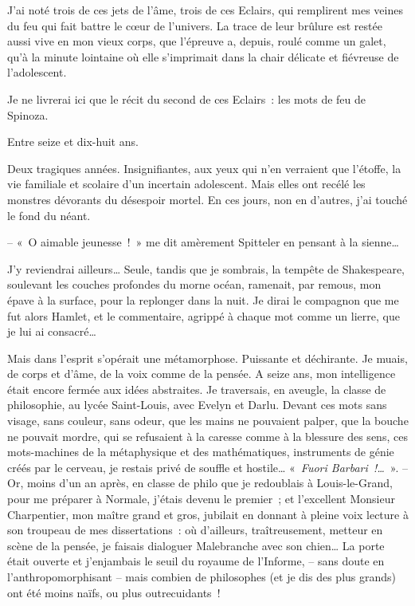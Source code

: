 J'ai noté trois de ces jets de l'âme, trois de ces Eclairs, qui
remplirent mes veines du feu qui fait battre le c\oe ur de l'univers. La
trace de leur brûlure est restée aussi vive en mon vieux corps, que
l'épreuve a, depuis, roulé comme un galet, qu'à la minute lointaine où
elle s'imprimait dans la chair délicate et fiévreuse de l'adolescent.

Je ne livrerai ici que le récit du second de ces Eclairs~: les mots de
feu de Spinoza.

Entre seize et dix-huit ans.

Deux tragiques années. Insignifiantes, aux yeux qui n'en verraient que
l'étoffe, la vie familiale et scolaire d'un incertain adolescent. Mais
elles ont recélé les monstres dévorants du désespoir mortel. En ces
jours, non en d'autres, j'ai touché le fond du néant.

-- «~O aimable jeunesse~!~» me dit amèrement Spitteler en pensant à la
sienne\ldots{}

J'y reviendrai ailleurs\ldots{} Seule, tandis que je sombrais, la tempête de
Shakespeare, soulevant les couches profondes du morne océan, ramenait,
par remous, mon épave à la surface, pour la replonger dans la nuit. Je
dirai le compagnon que me fut alors Hamlet, et le commentaire, agrippé à
chaque mot comme un lierre, que je lui ai consacré\ldots{}

Mais dans l'esprit s'opérait une métamorphose. Puissante et déchirante.
Je muais, de corps et d'âme, de la voix comme de la pensée. A seize ans,
mon intelligence était encore fermée aux idées abstraites. Je
traversais, en aveugle, la classe de philosophie, au lycée Saint-Louis,
avec Evelyn et Darlu. Devant ces mots sans visage, sans couleur, sans
odeur, que les mains ne pouvaient palper, que la bouche ne pouvait
mordre, qui se refusaient à la caresse comme à la blessure des sens, ces
mots-machines de la métaphysique et des mathématiques, instruments de
génie créés par le cerveau, je restais privé de souffle et hostile\ldots{}
«~\emph{Fuori Barbari~!\ldots{}}~». -- Or, moins d'un an après, en classe de
philo que je redoublais à Louis-le-Grand, pour me préparer à Normale,
j'étais devenu le premier~; et l'excellent Monsieur Charpentier, mon
maître grand et gros, jubilait en donnant à pleine voix lecture à son
troupeau de mes dissertations~: où d'ailleurs, traîtreusement, metteur
en scène de la pensée, je faisais dialoguer Malebranche avec son
chien\ldots{} La porte était ouverte et j'enjambais le seuil du royaume de
l'Informe, -- sans doute en l'anthropomorphisant -- mais combien de
philosophes (et je dis des plus grands) ont été moins naïfs, ou plus
outrecuidants~!

